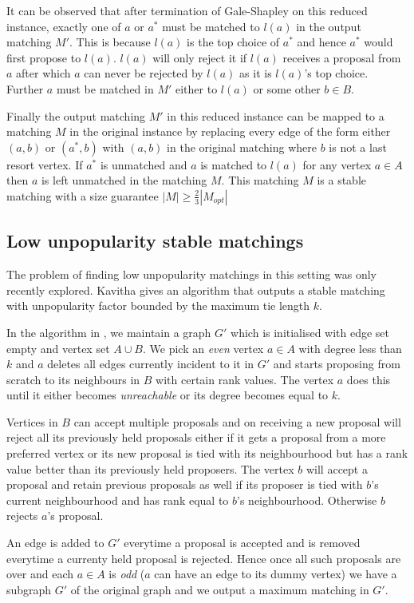 \documentclass[a4paper,10pt]{article}
\theoremstyle{plain} %
\theoremstyle{plain} %
\begin{document}
It can be observed that after termination of Gale-Shapley on this reduced instance, exactly one of $a$ or $a^*$ must be matched to $l(a)$ in the output matching $M'$. This is because $l(a)$ is the top choice of $a^*$ and hence $a^*$ would first propose to $l(a)$. $l(a)$ will only reject it if $l(a)$ receives a proposal from $a$ after which $a$ can never be rejected by $l(a)$ as it is $l(a)$'s top choice. Further $a$ must be matched in $M'$ either to $l(a)$ or some other $b \in B$.

Finally the output matching $M'$ in this reduced instance can be mapped to a matching $M$ in the original instance by replacing every edge of the form either $(a, b)$ or $(a^*, b)$ with $(a, b)$ in the original matching where $b$ is not a last resort vertex. If $a^*$ is unmatched and $a$ is matched to $l(a)$ for any vertex $a \in A$ then $a$ is left unmatched in the matching $M$. This matching $M$ is a stable matching with a size guarantee $|M| \geq \frac{2}{3}|M_{opt}|$

\subsection{Low unpopularity stable matchings}
The problem of finding low unpopularity matchings in this setting was only recently explored. Kavitha \cite{kavitha2022stable} gives an algorithm that outputs a stable matching with unpopularity factor bounded by the maximum tie length $k$. 

In the algorithm in \cite{kavitha2022stable}, we maintain a graph $G'$ which is initialised with edge set empty and vertex set $A \cup B$. We pick an \textit{even} vertex $a \in A$ with degree less than $k$ and $a$ deletes all edges currently incident to it in $G'$ and starts proposing from scratch to its neighbours in $B$ with certain rank values. The vertex $a$ does this until it either becomes \textit{unreachable} or its degree becomes equal to $k$.

Vertices in $B$ can accept multiple proposals and on receiving a new proposal will reject all its previously held proposals either if it gets a proposal from a more preferred vertex or its new proposal is tied with its neighbourhood but has a rank value better than its previously held proposers. The vertex $b$ will accept a proposal and retain previous proposals as well if its proposer is tied with $b$'s current neighbourhood and has rank equal to $b$'s neighbourhood. Otherwise $b$ rejects $a$'s proposal. 

An edge is added to $G'$ everytime a proposal is accepted and is removed everytime a currenty held proposal is rejected. Hence once all such proposals are over and each $a \in A$ is \textit{odd} ($a$ can have an edge to its dummy vertex) we have a subgraph $G'$ of the original graph and we output a maximum matching in $G'$. 
\end{document}
